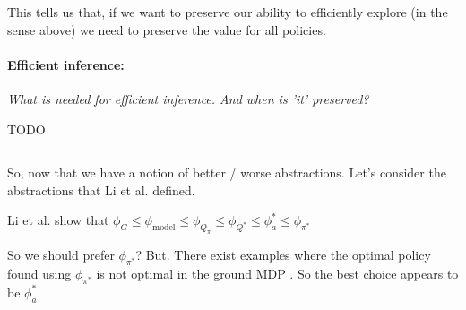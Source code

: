 
This tells us that, if we want to preserve our ability to efficiently explore (in the sense above) we need to preserve the value for all policies.



\paragraph{Efficient inference:} \textit{What is needed for efficient inference. And when is 'it' preserved?}


\cite{Allen-Zhu2016a,Johnson2013a}



{\color{red}TODO}

\begin{center}\rule{0.5\linewidth}{\linethickness}\end{center}

So, now that we have a notion of better / worse abstractions. Let's consider the abstractions
that Li et al. \cite{Littman2006} defined.

Li et al. \cite{Littman2006} show that $\phi_G \le \phi_{\text{model}} \le \phi_{Q_{\pi}} \le \phi_{Q^{* }} \le \phi_a^{* } \le \phi_{\pi^{* }}$

So we should prefer $\phi_{\pi^{* }}$? But.
There exist examples where the optimal policy found using $\phi_{\pi^{* }}$ is not optimal in the ground MDP \cite{Jong2005}.
So the best choice appears to be $\phi_a^{* }$.

